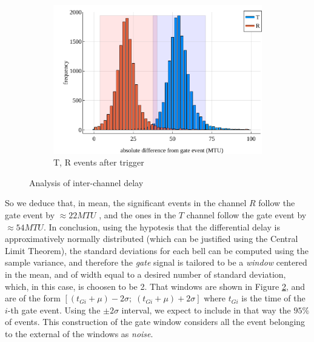 \documentclass[10pt, final]{article}
\begin{document}
\begin{multicols}{2}
\begin{mdframed}
\begin{figure}[H]
        \begin{subfigure}{\textwidth}
            \centering
            \includegraphics[width = \textwidth]{../images/after.pdf}
            \caption{T, R events after trigger}
            \label{after}
        \end{subfigure}
        \caption{Analysis of inter-channel delay}
    \end{figure}
\end{mdframed}
So we deduce that, in mean, the significant events in the channel $R$ follow the gate event by $\approx 22 MTU$ , and the ones in the $T$ channel follow the gate event by $\approx 54 MTU$.
In conclusion, using the hypotesis that the differential delay is approximatively normally distributed (which can be justified using the Central Limit Theorem), the standard deviations for each bell can be computed using the sample variance, and therefore the \emph{gate} signal is tailored to be a \emph{window} centered in the mean, and of width equal to a desired number of standard deviation, which, in this case, is choosen to be 2. That windows are shown in Figure \ref{after}, and are of the form $[(t_{Gi} + \mu) -2\sigma; \; (t_{Gi} + \mu) + 2\sigma]$ where $t_{Gi}$ is the time of the $i$-th gate event. Using the $\pm 2 \sigma$ interval, we expect to include in that way the $95\%$ of events. This construction of the gate window  considers all the event belonging to the external of the windows as \emph{noise}.  


\end{multicols}
\end{document}
